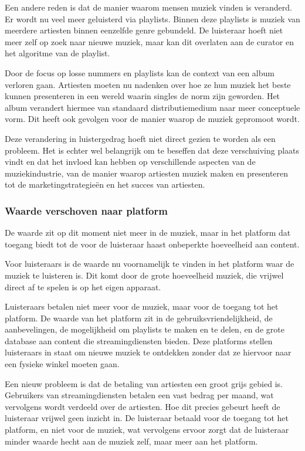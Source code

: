 Een andere reden is dat de manier waarom mensen muziek vinden is veranderd. Er wordt nu veel meer geluisterd via playlists. Binnen deze playlists is muziek van meerdere artiesten  binnen eenzelfde genre gebundeld. De luisteraar hoeft niet meer zelf op zoek naar nieuwe muziek, maar kan dit overlaten aan de curator en het algoritme van de playlist.

Door de focus op losse nummers en playlists kan de context van een album verloren gaan. Artiesten moeten nu nadenken over hoe ze hun muziek het beste kunnen presenteren in een wereld waarin singles de norm zijn geworden. Het album verandert hiermee van standaard distributiemedium naar meer conceptuele vorm. Dit heeft ook gevolgen voor de manier waarop de muziek gepromoot wordt.

Deze verandering in luistergedrag hoeft niet direct gezien te worden als een probleem. Het is echter wel belangrijk om te beseffen dat deze verschuiving plaats vindt en dat het invloed kan hebben op verschillende aspecten van de muziekindustrie, van de manier waarop artiesten muziek maken en presenteren tot de marketingstrategieën en het succes van artiesten.

\subsubsection*{Waarde verschoven naar platform}
\begin{quotebox}
De waarde zit op dit moment niet meer in de muziek, maar in het platform dat toegang biedt tot de voor de luisteraar haast onbeperkte hoeveelheid aan content.
\end{quotebox}

Voor luisteraars is de waarde nu voornamelijk te vinden in het platform waar de muziek te luisteren is. Dit komt door de grote hoeveelheid muziek, die vrijwel direct af te spelen is op het eigen apparaat.

Luisteraars betalen niet meer voor de muziek, maar voor de toegang tot het platform. De waarde van het platform zit in de gebruiksvriendelijkheid, de aanbevelingen, de mogelijkheid om playlists te maken en te delen, en de grote database aan content die streamingdiensten bieden. Deze platforms stellen luisteraars in staat om nieuwe muziek te ontdekken zonder dat ze hiervoor naar een fysieke winkel moeten gaan.

Een nieuw probleem is dat de betaling van artiesten een groot grijs gebied is. Gebruikers van streamingdiensten betalen een vast bedrag per maand, wat vervolgens wordt verdeeld over de artiesten. Hoe dit precies gebeurt heeft de luisteraar vrijwel geen inzicht in. De luisteraar betaald voor de toegang tot het platform, en niet voor de muziek, wat vervolgens ervoor zorgt dat de luisteraar minder waarde hecht aan de muziek zelf, maar meer aan het platform.

